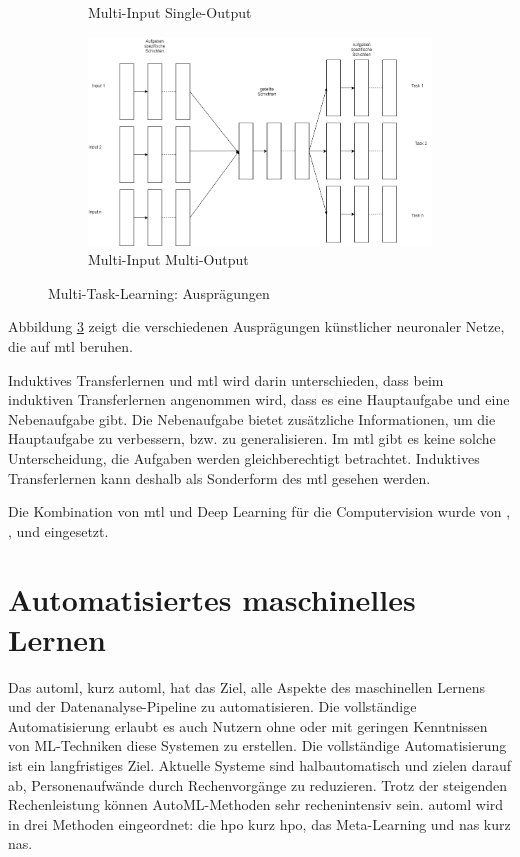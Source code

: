 \begin{figure}[h]
\begin{subfigure}[c]{0.49\textwidth}
				\caption[MTL-MISO]{Multi-Input Single-Output}
				\label{img:MTL_MISO}	
			\end{subfigure}
			\begin{subfigure}[c]{0.49\textwidth}			
				\includegraphics[width=1\textwidth, center]{bilder/Grundlagen/MTL/MTL_MIMO.png}
				\caption[MTL-MIMO]{Multi-Input Multi-Output}
				\label{img:MTL-MIMO}	
			\end{subfigure}
			\caption{Multi-Task-Learning: Ausprägungen}
			\label{img:MultiTaskLernen}
		\end{figure}
		Abbildung \ref{img:MultiTaskLernen} zeigt die verschiedenen Ausprägungen künstlicher neuronaler Netze, die auf \ac{mtl} beruhen.
		
		Induktives Transferlernen und \acl{mtl} wird darin unterschieden, dass beim induktiven Transferlernen angenommen wird, dass es eine Hauptaufgabe und eine Nebenaufgabe gibt. Die Nebenaufgabe bietet zusätzliche Informationen, um die Hauptaufgabe zu verbessern, bzw. zu generalisieren. Im \ac{mtl} gibt es keine solche Unterscheidung, die Aufgaben werden gleichberechtigt betrachtet. Induktives Transferlernen kann deshalb als Sonderform des \acl{mtl} gesehen werden. 
		
		Die Kombination von \acl{mtl} und Deep Learning für die Computervision wurde von \cite{YuchunFang.2017}, \cite{Li.2016}, \cite{RajeevRanjan.2016} und \cite{Zhao.2019} eingesetzt.

	\section{Automatisiertes maschinelles Lernen}
	\label{sec:AutoML}
	Das \acl{automl}, kurz \ac{automl}, hat das Ziel, alle Aspekte des maschinellen Lernens und der Datenanalyse-Pipeline zu automatisieren. Die vollständige Automatisierung erlaubt es auch Nutzern ohne oder mit geringen Kenntnissen von ML-Techniken diese Systemen zu erstellen. Die vollständige Automatisierung ist ein langfristiges Ziel. Aktuelle Systeme sind halbautomatisch und zielen darauf ab, Personenaufwände durch Rechenvorgänge zu reduzieren. Trotz der steigenden Rechenleistung können AutoML-Methoden sehr rechenintensiv sein. \ac{automl} wird in drei Methoden eingeordnet: die \acl{hpo} kurz \ac{hpo}, das  Meta-Learning und \acl{nas} kurz \ac{nas}. 
	\cite{Hutter.2019} 
	
